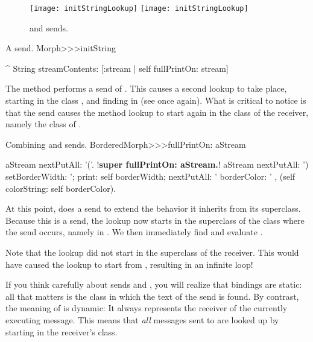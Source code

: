 \documentclass[a4paper,10pt,twoside]{book}
\begin{document}
\begin{figure}[htb]
\begin{center}
\ifluluelse
	{\texttt{[image: initStringLookup]}}
	{\texttt{[image: initStringLookup]}}
\caption{\self and \super sends\label{fig:initStringLookup}.}
\end{center}
\end{figure}

\begin{method}[initString]{A \self send.}
Morph>>>initString

	^ String streamContents: [:stream | self fullPrintOn: stream]
\end{method}
The method  performs a \self send of .
This causes a second lookup to take place, starting in the class , and finding  in  (see  once again).
What is critical to notice is that the \self send causes the method lookup to start again in the class of the receiver, namely the class of .


\begin{method}[fullPrintOn]{Combining \super and \self sends.}
BorderedMorph>>>fullPrintOn: aStream

	aStream nextPutAll: '('.
	!\textbf{super fullPrintOn: aStream.}!
	aStream
		nextPutAll: ') setBorderWidth: ';
		print: self borderWidth;
		nextPutAll: ' borderColor: ' , (self colorString: self borderColor).
\end{method}
At this point,  does a \super send to extend the
 behavior it inherits from its superclass.
Because this is a \super send, the lookup now starts in the superclass of the class where the \super send occurs, namely in .
We then immediately find and evaluate .

Note that the \super lookup did not start in the superclass of the receiver.
This would have caused the lookup to start from , resulting in an infinite loop!


If you think carefully about \super sends and , you will realize that \super bindings are static: all that matters is the class in which the text of the \super send is found.
By contrast, the meaning of \self is dynamic:
It always represents the receiver of the currently executing message.
This means that \emph{all} messages sent to \self are looked up by starting in the receiver's class.
\end{document}
